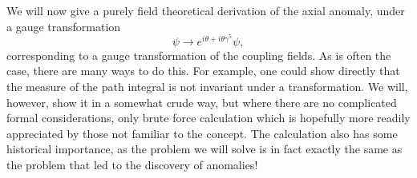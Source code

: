 \begin{comment}
  To put this in the context of condensed matter physics, we will consider the lowest Landau level in a 3D Weyl SM, with the energy $\epsilon = - s\hbar v_F \vec{k} \cdot \hat{B}$, where $s$ is the chirality of the Weyl point and $\hat{B}$ is the direction of the $\vec{B}$-field~\cite{arjonaFingerprintsConformalAnomaly2019}.
  Applying then an electric field $\vec{E}$ perpendicular to the magnetic field $\vec{B}$, all states will be shifted along the electric field according to $\hbar \vec\dot{k} = -e \vec{E}$, with the minus sign coming from the electron having negative charge.
  For the lowest level state, which is chiral, this means that electrons are either disappearing or appearing at the Weyl point.
  The charge is thus not locally conserved around the Weyl point, with the modified continuity equation
  \begin{equation}
    \frac{\partial n}{\partial t} + \nabla \cdot \vec{J} =
    \pm \frac{e^2}{4 \pi^2 \hbar^2 } \vec{E} \cdot \vec{B}.
  \end{equation}
  This non-conservation is an inherently quantum effect.
  Interestingly, this gives yet another explanation, in addition to the Chern conservation explanation, as to why Weyl points must always appear in pairs of opposite chirality, as overall the charge must of course be conserved.
  This gives rise to an interesting effect, which manifests itself in the materials transport properties.
  For a pair of opposite Weyl points separated in momentum space, the anomaly gives an imbalance between the two nodes
  \begin{equation}
    \frac{\partial (n_+ - n_-)}{\partial t} = \frac{e^2}{2 \pi^2 \hbar^2} \vec{E} \cdot \vec{B}.
  \end{equation}
  This charge imbalance, between the nodes separated in momentum space, can be relaxed only by a large momentum scattering, and thus the relaxation time is very long for systems with few impurities.
  This causes the conductivity along the direction of the magnetic field to increase~\cite{wehlingDiracMaterials2014}.
\end{comment}

We will now give a purely field theoretical derivation of the axial anomaly, under a gauge transformation
\begin{equation}
  \psi \to  e^{i \theta + i\theta \gamma^5} \psi,
\end{equation}
corresponding to a gauge transformation of the coupling fields.
As is often the case, there are many ways to do this.
For example, one could show directly that the measure of the path integral is not invariant under a transformation.
We will, however, show it in a somewhat crude way, but where there are no complicated formal considerations, only brute force calculation which is hopefully more readily appreciated by those not familiar to the concept.
The calculation also has some historical importance, as the problem we will solve is in fact exactly the same as the problem that led to the discovery of anomalies!

